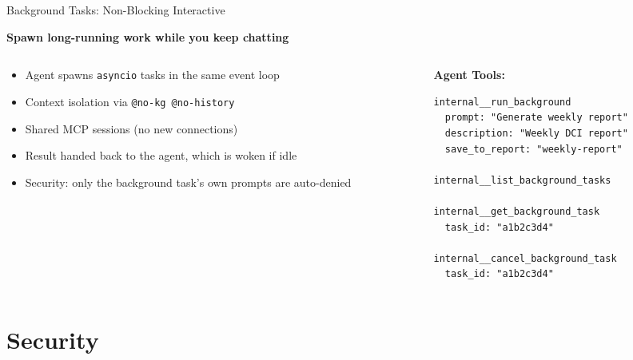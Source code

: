 \documentclass[aspectratio=169,10pt]{beamer}
\begin{document}
\begin{frame}[fragile]{Background Tasks: Non-Blocking Interactive}

\textbf{Spawn long-running work while you keep chatting}

\begin{columns}[T]
\begin{column}{0.5\textwidth}
\begin{itemize}
  \item Agent spawns \texttt{asyncio} tasks in the same event loop
  \item Context isolation via \texttt{@no-kg @no-history}
  \item Shared MCP sessions (no new connections)
  \item Result handed back to the agent, which is woken if idle
  \item Security: only the background task's own prompts are auto-denied
\end{itemize}
\end{column}
\begin{column}{0.48\textwidth}
\textbf{Agent Tools:}
\begin{lstlisting}[style=json,basicstyle=\tiny\ttfamily]
internal__run_background
  prompt: "Generate weekly report"
  description: "Weekly DCI report"
  save_to_report: "weekly-report"

internal__list_background_tasks

internal__get_background_task
  task_id: "a1b2c3d4"

internal__cancel_background_task
  task_id: "a1b2c3d4"
\end{lstlisting}
\end{column}
\end{columns}
\end{frame}

\section{Security}
\end{document}
